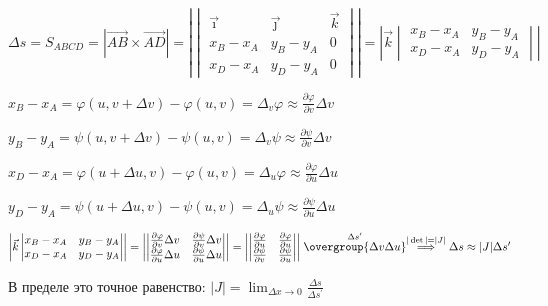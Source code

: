\documentclass[12pt]{article}
\begin{document}
    $\Delta s = S_{ABCD} = |\overrightarrow{AB} \times \overrightarrow{AD}| = \left|
    \begin{vmatrix}
        \vec\imath & \vec\jmath & \vec{k} \\
        x_B - x_A          & y_B - y_A          & 0                  \\
        x_D - x_A          & y_D - y_A          & 0
    \end{vmatrix}\right| = \left| \vec{k}
    \begin{vmatrix}
        x_B - x_A & y_B - y_A \\
        x_D - x_A & y_D - y_A
    \end{vmatrix}\right|$

    $x_B - x_A = \varphi(u, v + \Delta v) - \varphi(u, v) = \Delta_v \varphi \approx \frac{\partial \varphi}{\partial v}\Delta v$

    $y_B - y_A = \psi(u, v + \Delta v) - \psi(u, v) = \Delta_v \psi \approx \frac{\partial \psi}{\partial v}\Delta v$

    $x_D - x_A = \varphi(u + \Delta u, v) - \varphi(u, v) = \Delta_u \varphi \approx \frac{\partial \varphi}{\partial u}\Delta u$

    $y_D - y_A = \psi(u + \Delta u, v) - \psi(u, v) = \Delta_u \psi \approx \frac{\partial \psi}{\partial u}\Delta u$

    $\left| \vec{k}
    \begin{vmatrix}
        x_B - x_A & y_B - y_A \\
        x_D - x_A & y_D - y_A
    \end{vmatrix}\right| = \left|
    \begin{vmatrix}
        \frac{\partial \varphi}{\partial v}\Delta v & \frac{\partial \psi}{\partial v}\Delta v \\
        \frac{\partial \varphi}{\partial u}\Delta u & \frac{\partial \psi}{\partial u}\Delta u
    \end{vmatrix}\right| = \left|
    \begin{vmatrix}
        \frac{\partial \varphi}{\partial u} & \frac{\partial \varphi}{\partial u} \\
        \frac{\partial \psi}{\partial v}    & \frac{\partial \psi}{\partial u}
    \end{vmatrix}\right| \stackrel{\Delta s^\prime}{\overgroup{\Delta v \Delta u}} \stackrel{|\det| = |J|}{\Longrightarrow} \Delta s \approx |J|\Delta s^\prime$

    \Nota В пределе это точное равенство: $|J| = \lim_{\Delta x \to 0} \frac{\Delta s}{\Delta s^\prime}$
\end{document}
